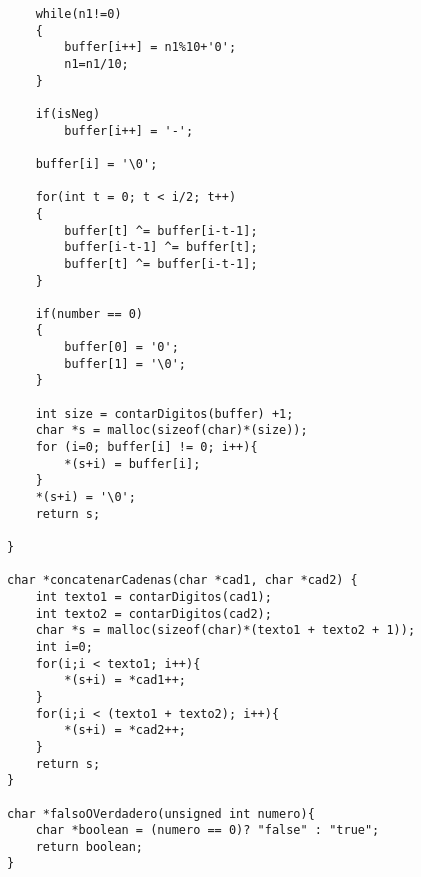 \begin{lstlisting}
	while(n1!=0)
	{
	    buffer[i++] = n1%10+'0';
	    n1=n1/10;
	}

	if(isNeg)
	    buffer[i++] = '-';

	buffer[i] = '\0';

	for(int t = 0; t < i/2; t++)
	{
	    buffer[t] ^= buffer[i-t-1];
	    buffer[i-t-1] ^= buffer[t];
	    buffer[t] ^= buffer[i-t-1];
	}

	if(number == 0)
	{
	    buffer[0] = '0';
	    buffer[1] = '\0';
	}  

	int size = contarDigitos(buffer) +1;
	char *s = malloc(sizeof(char)*(size));
	for (i=0; buffer[i] != 0; i++){
		*(s+i) = buffer[i];
	}
	*(s+i) = '\0';
	return s;

}

char *concatenarCadenas(char *cad1, char *cad2) {
	int texto1 = contarDigitos(cad1);
	int texto2 = contarDigitos(cad2);
	char *s = malloc(sizeof(char)*(texto1 + texto2 + 1));
	int i=0;
	for(i;i < texto1; i++){
		*(s+i) = *cad1++;
	}
	for(i;i < (texto1 + texto2); i++){
		*(s+i) = *cad2++;
	}
	return s;
}

char *falsoOVerdadero(unsigned int numero){
	char *boolean = (numero == 0)? "false" : "true";
	return boolean;
}
\end{lstlisting}

\pagebreak